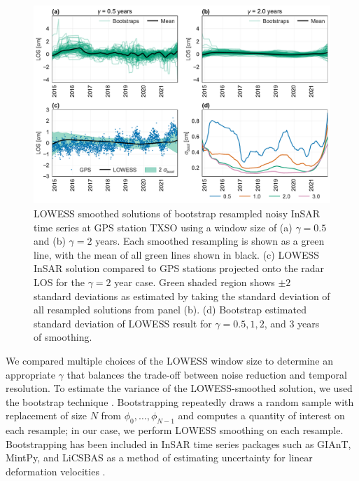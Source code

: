 \begin{figure}[h]
	\centering
	\includegraphics[width=.99\textwidth]{figures/chapter5-lowess/figure-results-bootstrap.pdf}
	\caption[Cumulative 7-year LOS deformation for three Sentinel-1 paths]{
	LOWESS smoothed solutions of bootstrap resampled noisy InSAR time series at GPS station TXSO using a window size of (a) $ \gamma = 0.5 $ and (b) $ \gamma = 2 $ years. Each smoothed resampling is shown as a green line, with the mean of all green lines shown in black.
	(c) LOWESS InSAR solution compared to GPS stations projected onto the radar LOS for the $ \gamma = 2 $ year case. Green shaded region shows $ \pm 2  $ standard deviations as estimated by taking the standard deviation of all resampled solutions from panel (b).
	(d) Bootstrap estimated standard deviation of LOWESS result for $ \gamma = 0.5, 1, 2 $, and $ 3 $ years of smoothing.
	}
	\label{fig:ch5-results-bootstrap}
\end{figure}


We compared multiple choices of the LOWESS window size to determine an appropriate $ \gamma $ that balances the trade-off between noise reduction and temporal resolution.
To estimate the variance of the LOWESS-smoothed solution, we used the bootstrap technique \citep{Efron1979BootstrapMethodsAnother, Efron1994IntroductionBootstrap}.
Bootstrapping repeatedly draws a random sample with replacement of size $ N $ from $ \phi_0, \ldots, \phi_{N-1} $ and computes a quantity of interest on each resample; in our case, we perform LOWESS smoothing on each resample.
Bootstrapping has been included in InSAR time series packages such as GIAnT, MintPy, and LiCSBAS as a method of estimating uncertainty for linear deformation velocities
\citep{Agram2013NewRadarInterferometric, Yunjun2019SmallBaselineInsar, Morishita2020LicsbasOpenSource}.

